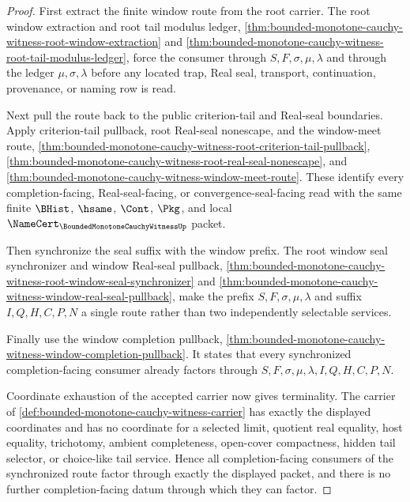 \begin{proof}
First extract the finite window route from the root carrier. The root window extraction and root tail modulus ledger, \autoref{thm:bounded-monotone-cauchy-witness-root-window-extraction} and \autoref{thm:bounded-monotone-cauchy-witness-root-tail-modulus-ledger}, force the consumer through $S,F,\sigma,\mu,\lambda$ and through the ledger $\mu,\sigma,\lambda$ before any located trap, Real seal, transport, continuation, provenance, or naming row is read.

Next pull the route back to the public criterion-tail and Real-seal boundaries. Apply criterion-tail pullback, root Real-seal nonescape, and the window-meet route, \autoref{thm:bounded-monotone-cauchy-witness-root-criterion-tail-pullback}, \autoref{thm:bounded-monotone-cauchy-witness-root-real-seal-nonescape}, and \autoref{thm:bounded-monotone-cauchy-witness-window-meet-route}. These identify every completion-facing, Real-seal-facing, or convergence-seal-facing read with the same finite $\BHist$, $\hsame$, $\Cont$, $\Pkg$, and local $\NameCert_{\BoundedMonotoneCauchyWitnessUp}$ packet.

Then synchronize the seal suffix with the window prefix. The root window seal synchronizer and window Real-seal pullback, \autoref{thm:bounded-monotone-cauchy-witness-root-window-seal-synchronizer} and \autoref{thm:bounded-monotone-cauchy-witness-window-real-seal-pullback}, make the prefix $S,F,\sigma,\mu,\lambda$ and suffix $I,Q,H,C,P,N$ a single route rather than two independently selectable services.

Finally use the window completion pullback, \autoref{thm:bounded-monotone-cauchy-witness-window-completion-pullback}. It states that every synchronized completion-facing consumer already factors through $S,F,\sigma,\mu,\lambda,I,Q,H,C,P,N$.

Coordinate exhaustion of the accepted carrier now gives terminality. The carrier of \autoref{def:bounded-monotone-cauchy-witness-carrier} has exactly the displayed coordinates and has no coordinate for a selected limit, quotient real equality, host equality, trichotomy, ambient completeness, open-cover compactness, hidden tail selector, or choice-like tail service. Hence all completion-facing consumers of the synchronized route factor through exactly the displayed packet, and there is no further completion-facing datum through which they can factor.
\end{proof}

